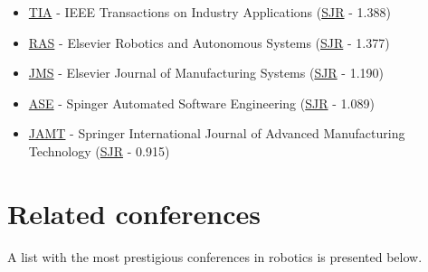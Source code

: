 \begin{itemize}[leftmargin=2em]
	\item \href{http://ieeexplore.ieee.org/xpl/RecentIssue.jsp?punumber=28}{TIA} - IEEE Transactions on Industry Applications (\href{http://www.scimagojr.com/journalsearch.php?q=17361\&tip=sid\&clean=0}{SJR} - 1.388)
	\item \href{http://www.journals.elsevier.com/robotics-and-autonomous-systems/}{RAS} - Elsevier Robotics and Autonomous Systems (\href{http://www.scimagojr.com/journalsearch.php?q=18079\&tip=sid\&clean=0}{SJR} - 1.377)
	\item \href{http://www.journals.elsevier.com/journal-of-manufacturing-systems/}{JMS} - Elsevier Journal of Manufacturing Systems (\href{http://www.scimagojr.com/journalsearch.php?q=14966\&tip=sid\&clean=0}{SJR} - 1.190)
	\item \href{http://www.springer.com/computer/ai/journal/10515}{ASE} - Spinger Automated Software Engineering (\href{http://www.scimagojr.com/journalsearch.php?q=24145\&tip=sid\&clean=0}{SJR} - 1.089)
	\item \href{http://www.springer.com/engineering/production+engineering/journal/170}{JAMT} - Springer International Journal of Advanced Manufacturing Technology (\href{http://www.scimagojr.com/journalsearch.php?q=20428\&tip=sid\&clean=0}{SJR} - 0.915)
\end{itemize}




\section{Related conferences}

A list with the most prestigious conferences in robotics is presented below.

